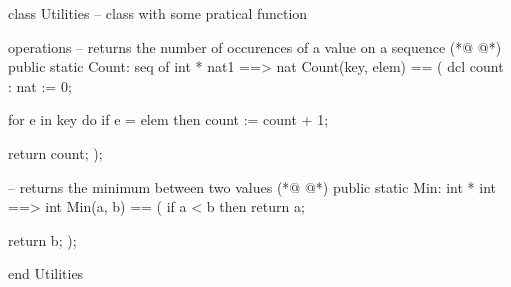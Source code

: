\begin{vdmpp}[breaklines=true]
class Utilities -- class with some pratical function

operations
 -- returns the number of occurences of a value on a sequence
(*@
\label{Count:5}
@*)
 public static Count: seq of int * nat1 ==> nat
  Count(key, elem) == (
   dcl count : nat := 0;
  
   for e in key do
    if e = elem
     then
      count := count + 1;
      
   return count;
  );
 
 -- returns the minimum between two values
(*@
\label{Min:18}
@*)
 public static Min: int * int ==> int
  Min(a, b) == (
   if a < b
    then
     return a;
     
   return b; 
  );
 
end Utilities
\end{vdmpp}
